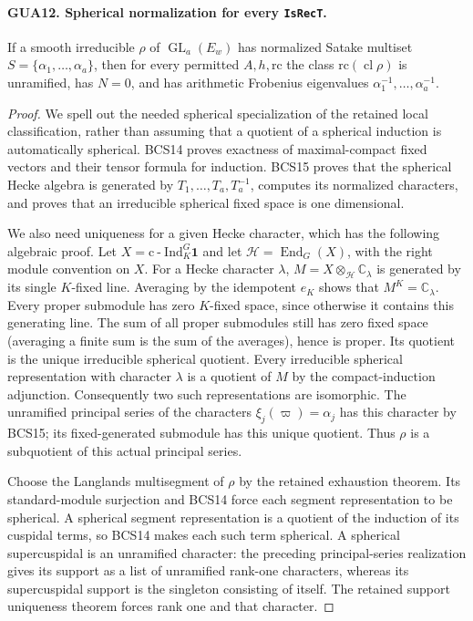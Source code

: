 \paragraph{GUA12. Spherical normalization for every \texttt{IsRecT}.}
\label{claim:GUA12}
If a smooth irreducible $\rho$ of $\operatorname{GL}_a(E_w)$
has normalized Satake multiset $S=\{\alpha_1,\ldots,\alpha_a\}$,
then for every permitted $A,h,\mathrm{rc}$ the class
$\mathrm{rc}(\operatorname{cl}\rho)$ is unramified,
has $N=0$, and has arithmetic Frobenius eigenvalues
$\alpha_1^{-1},\ldots,\alpha_a^{-1}$.
\begin{proof}
We spell out the needed spherical specialization of the
retained local classification, rather than assuming that
a quotient of a spherical induction is automatically
spherical.  BCS14 proves exactness of maximal-compact
fixed vectors and their tensor formula for induction.
BCS15 proves that the spherical Hecke algebra is generated
by $T_1,\ldots,T_a,T_a^{-1}$, computes its normalized
characters, and proves that an irreducible spherical
fixed space is one dimensional.

We also need uniqueness for a given Hecke character,
which has the following algebraic proof.  Let
$X=\mathrm{c\!\operatorname{-}Ind}_K^G\mathbf1$ and let
$\mathcal H=\operatorname{End}_G(X)$, with the right
module convention on $X$.  For a Hecke character $\lambda$,
$M=X\otimes_{\mathcal H}\mathbb C_\lambda$ is generated
by its single $K$-fixed line.  Averaging by the idempotent
$e_K$ shows that $M^K=\mathbb C_\lambda$.  Every proper
submodule has zero $K$-fixed space, since otherwise it
contains this generating line.  The sum of all proper
submodules still has zero fixed space (averaging a
finite sum is the sum of the averages), hence is proper.
Its quotient is the unique irreducible spherical quotient.
Every irreducible spherical representation with character
$\lambda$ is a quotient of $M$ by the compact-induction
adjunction.  Consequently two such representations are
isomorphic.  The unramified principal series of the
characters $\xi_j(\varpi)=\alpha_j$ has this character
by BCS15; its fixed-generated submodule has this unique
quotient.  Thus $\rho$ is a subquotient of this actual
principal series.

Choose the Langlands multisegment of $\rho$ by the
retained exhaustion theorem.  Its standard-module
surjection and BCS14 force each segment representation
to be spherical.  A spherical segment representation is
a quotient of the induction of its cuspidal terms, so
BCS14 makes each such term spherical.  A spherical
supercuspidal is an unramified character: the preceding
principal-series realization gives its support as a
list of unramified rank-one characters, whereas its
supercuspidal support is the singleton consisting of
itself.  The retained support uniqueness theorem forces
rank one and that character.


\end{proof}
